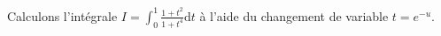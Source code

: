 \documentclass[french,11pt,twoside]{VcCours}
\newcommand{\dt}{\text{d}t}
\begin{document}
\begin{Exemple} Calculons l'intégrale $I=\int_{0}^1 \frac{1+t^2}{1+t^4} \dt$ à l'aide du changement de variable $t=e^{-u}$.

\vspace{7cm}
%
\end{Exemple}

\newpage

$\phantom{test}$
\end{document}
